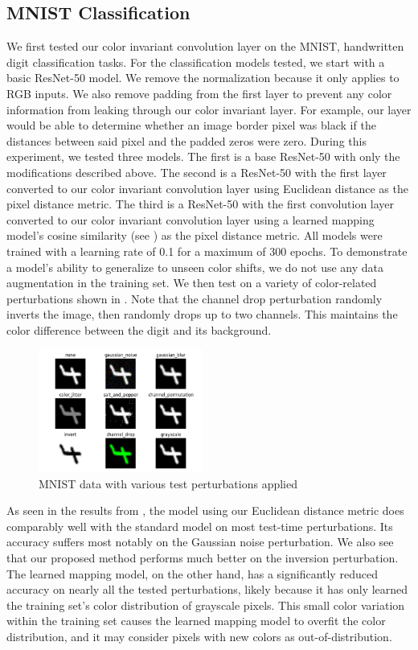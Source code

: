\documentclass[10pt,twocolumn,letterpaper]{article}
\begin{document}
\subsection{MNIST Classification}
\label{mnistClassification}
We first tested our color invariant convolution layer on the MNIST, handwritten digit classification tasks. For the classification models tested, we start with a basic ResNet-50 model. We remove the normalization because it only applies to RGB inputs. We also remove padding from the first layer to prevent any color information from leaking through our color invariant layer. For example, our layer would be able to determine whether an image border pixel was black if the distances between said pixel and the padded zeros were zero. During this experiment, we tested three models. The first is a base ResNet-50 with only the modifications described above. The second is a ResNet-50 with the first layer converted to our color invariant convolution layer using Euclidean distance as the pixel distance metric. The third is a ResNet-50 with the first convolution layer converted to our color invariant convolution layer using a learned mapping model's cosine similarity (see ) as the pixel distance metric. All models were trained with a learning rate of 0.1 for a maximum of 300 epochs. To demonstrate a model's ability to generalize to unseen color shifts, we do not use any data augmentation in the training set. We then test on a variety of color-related perturbations shown in . Note that the channel drop perturbation randomly inverts the image, then randomly drops up to two channels. This maintains the color difference between the digit and its background.

\begin{figure}[h!]
    \centering
    \includegraphics[width=0.48\textwidth]{images/mnist_perturbations.png}
    \caption{MNIST data with various test perturbations applied}
    \label{mnist_perturbations}
\end{figure}

As seen in the results from , the model using our Euclidean distance metric does comparably well with the standard model on most test-time perturbations. Its accuracy suffers most notably on the Gaussian noise perturbation. We also see that our proposed method performs much better on the inversion perturbation. The learned mapping model, on the other hand, has a significantly reduced accuracy on nearly all the tested perturbations, likely because it has only learned the training set's color distribution of grayscale pixels. This small color variation within the training set causes the learned mapping model to overfit the color distribution, and it may consider pixels with new colors as out-of-distribution.
\end{document}
